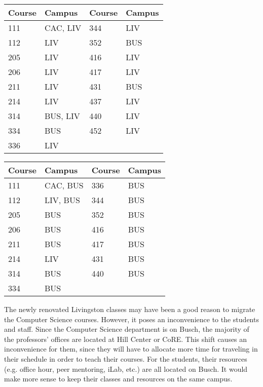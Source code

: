 \documentclass[12pt]{article}
\begin{document}
			\begin{center}
				 \label{tab:asdf} 
				\begin{tabular}{ | l | l | l | l | }
					\hline
					Course & Campus & Course &	Campus \\ \hline
					111 & CAC, LIV & 344 & LIV \\ \hline
					112 & LIV & 352 & BUS \\ \hline
					205 & LIV & 416 & LIV \\ \hline
					206 & LIV & 417 & LIV \\ \hline
					211 & LIV & 431 & BUS \\ \hline
					214 & LIV & 437 & LIV \\ \hline
					314 & BUS, LIV & 440 & LIV \\ \hline
					334 & BUS & 452 & LIV \\ \hline
					336 & LIV & & \\ 
					\hline
				\end{tabular}
			\end{center}
			\begin{center}
				 \label{tab:title} 
				\begin{tabular} { | l | l | l | l | }
					\hline
					Course & 	Campus & Course & Campus \\ \hline
					111 & CAC, BUS & 336 & BUS \\ \hline
					112 & LIV, BUS & 344 & BUS \\ \hline
					205 & BUS & 352 & BUS \\ \hline	
					206 & BUS &	416 & BUS \\ \hline
					211 & BUS &	417 & BUS \\ \hline		
					214 & LIV &	431 & BUS \\ \hline		
					314 & BUS & 440 & BUS \\ \hline		
					334 & BUS & & \\
					\hline
				\end{tabular}
			\end{center}
			The newly renovated Livingston classes may have been a good reason to migrate
			the Computer Science courses. However, it poses an inconvenience to the
			students and staff. Since the Computer Science department is on Busch, the
			majority of the professors’ offices are located at Hill Center or CoRE. This
			shift causes an inconvenience for them, since they will have to allocate more
			time for traveling in their schedule in order to teach their courses. For the
			students, their resources (e.g. office hour, peer mentoring, iLab, etc.) are
			all located on Busch. It would make more sense to keep their classes and
			resources on the same campus. 
\end{document}
